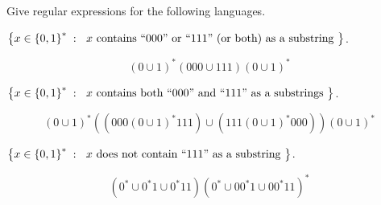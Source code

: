 \begin{problem}
  Give regular expressions for the following languages.
  \begin{enumalph}
    \item $\left\{x \in \left\{0, 1\right\}^*\; : \;
      \text{ $x$ contains ``$000$'' or ``$111$'' (or both) as a substring }\right\}$.
    \begin{Answer}
      \[ (0 \cup 1)^* (000 \cup 111) (0 \cup 1)^* \]
    \end{Answer}
    \item $\left\{x \in \left\{0, 1\right\}^*\; : \;
      \text{ $x$ contains both ``$000$'' and ``$111$'' as a substrings }\right\}$.
    \begin{Answer}
      \[ (0 \cup 1)^* ((000 (0 \cup 1)^* 111) \cup (111 (0 \cup 1)^* 000)) (0 \cup 1)^* \]
    \end{Answer}
    \item $\left\{x \in \left\{0, 1\right\}^*\; : \;
      \text{ $x$ does not contain ``$111$'' as a substring }\right\}$.
    \begin{Answer}  
      \[ (0^* \cup 0^*1 \cup 0^*11)(0^* \cup 00^*1 \cup 00^*11)^* \]
    \end{Answer}
  \end{enumalph}
\end{problem}
